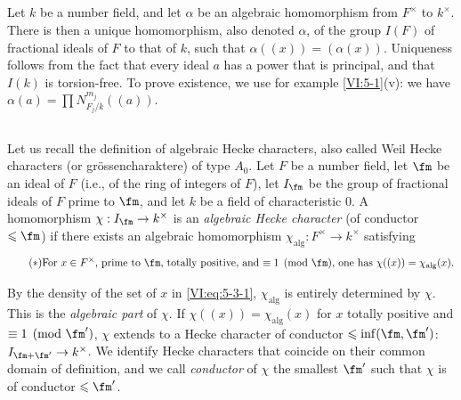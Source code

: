 \subsection{}\label{VI:5-2}

Let $k$ be a number field, and let $\alpha$ be an algebraic homomorphism 
from $F^\times$ to $k^\times$. There is then a unique 
homomorphism, also denoted $\alpha$, of the group $I(F)$ 
of fractional ideals of $F$ to that of $k$, such that $\alpha((x))=(\alpha(x))$. 
Uniqueness follows from the fact that every ideal $a$ has a power that is 
principal, and that $I(k)$ is torsion-free. To prove 
existence, we use for example \ref{VI:5-1}(v): we have 
$\alpha(a) = \prod N_{F_j/k}^{m_j}((a))$. 





\subsection{}\label{VI:5-3}

Let us recall the definition of algebraic Hecke characters, also called 
Weil Hecke characters (or gr\"ossencharaktere) of type $A_0$. Let $F$ be 
a number field, let $\fm$ be an ideal of $F$ (i.e., of the ring of integers of 
$F$), let $I_\fm$ be the group of fractional ideals of $F$ prime to $\fm$, 
and let $k$ be a field of characteristic $0$. A homomorphism 
$\chi:I_\fm \to k^\times$ is an \emph{algebraic Hecke character} (of 
conductor $\leqslant \fm$) if there exists an algebraic homomorphism 
$\chi_\text{alg}:F^\times \to k^\times$ satisfying 
\begin{equation*}\tag{$*$}\label{VI:eq:5-3-1}
\text{For $x\in F^\times$, prime to $\fm$, totally positive, and 
$\equiv 1\pmod\fm$, one has $\chi((x))=\chi_\text{alg}(x)$.}
\end{equation*}

By the density of the set of $x$ in \eqref{VI:eq:5-3-1}, $\chi_\text{alg}$ 
is entirely determined by $\chi$. This is the \emph{algebraic part} 
of $\chi$. If $\chi((x))=\chi_\text{alg}(x)$ for $x$ totally positive and 
$\equiv 1\pmod{\fm'}$, $\chi$ extends to a Hecke character of 
conductor $\leqslant \inf(\fm,\fm')$: $I_{\fm+\fm'}\to k^\times$. We 
identify Hecke characters that coincide on their common domain of 
definition, and we call \emph{conductor} of $\chi$ the smallest $\fm'$ 
such that $\chi$ is of conductor $\leqslant \fm'$. 





